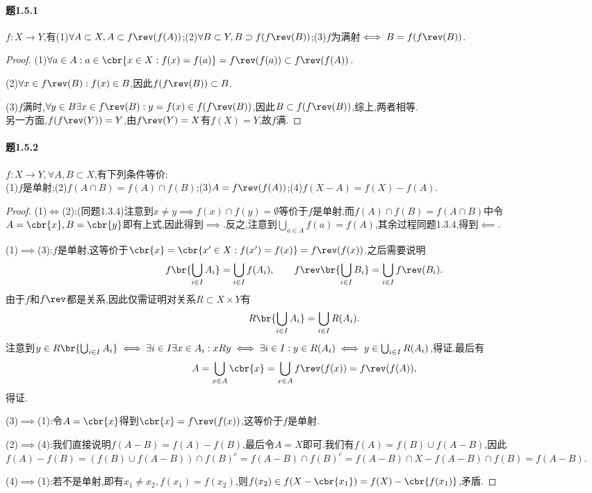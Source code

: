 \documentclass{article}
\begin{document}
\paragraph{题1.5.1}$f:X\to Y$,有(1)$\forall A\subset X, A\subset f\rev(f(A))$;(2)$\forall B\subset Y, B\supset f(f\rev(B))$;(3)$f$为满射$\iff B=f(f\rev(B))$.
\begin{proof}
    (1)$\forall a\in A: a\in \cbr{x\in X:f(x)=f(a)}=f\rev(f(a))\subset f\rev(f(A))$.

    (2)$\forall x\in f\rev(B):f(x)\in B$,因此$f(f\rev(B))\subset B$.

    (3)$f$满时,$\forall y\in B\exists x\in f\rev(B):y=f(x)\in f(f\rev(B))$,因此$B\subset f(f\rev(B))$,综上,两者相等.\\
    另一方面,$f(f\rev(Y))=Y$,由$f\rev(Y)=X$有$f(X)=Y$,故$f$满.
\end{proof}

\paragraph{题1.5.2}$f:X\to Y, \forall A,B\subset X$,有下列条件等价:\\
(1)$f$是单射;(2)$f(A\cap B)=f(A)\cap f(B)$;(3)$A=f\rev(f(A))$;(4)$f(X-A)=f(X)-f(A)$.
\begin{proof}
    (1)$\iff$(2):(同题1.3.4)注意到$x\neq y\implies f(x)\cap f(y)=\emptyset$等价于$f$是单射,而$f(A)\cap f(B)=f(A\cap B)$中令$A=\cbr{x},B=\cbr{y}$即有上式,因此得到$\implies$.反之,注意到$\bigcup_{a\in A}f(a)=f(A)$,其余过程同题1.3.4,得到$\impliedby$.

    (1)$\implies$(3):$f$是单射,这等价于$\cbr{x}=\cbr{x'\in X:f(x')=f(x)}=f\rev(f(x))$.之后需要说明
    $$f\br{\bigcup_{i\in I}A_i}=\bigcup_{i\in I}f(A_i),\qquad f\rev\br{\bigcup_{i\in I}B_i}=\bigcup_{i\in I}f\rev(B_i).$$
    由于$f$和$f\rev$都是关系,因此仅需证明对关系$R\subset X\times Y$有$$R\br{\bigcup_{i\in I}A_i}=\bigcup_{i\in I}R(A_i).$$
    注意到$y\in R\br{\bigcup_{i\in I}A_i}\iff \exists i\in I\exists x\in A_i:xRy\iff \exists i\in I:y\in R(A_i)\iff y\in \bigcup_{i\in I}R(A_i)$,得证.最后有
    $$A=\bigcup_{x\in A}\cbr{x}=\bigcup_{x\in A}f\rev(f(x))=f\rev(f(A)),$$得证.

    (3)$\implies$(1):令$A=\cbr{x}$得到$\cbr{x}=f\rev(f(x))$,这等价于$f$是单射.

    (2)$\implies$(4):我们直接说明$f(A-B)=f(A)-f(B)$,最后令$A=X$即可.我们有$f(A)=f(B)\cup f(A-B)$,因此$f(A)-f(B)=(f(B)\cup f(A-B))\cap f(B)^c=f(A-B)\cap f(B)^c=f(A-B)\cap X-f(A-B)\cap f(B)=f(A-B)$.

    (4)$\implies$(1):若不是单射,即有$x_1\neq x_2, f(x_1)=f(x_2)$,则$f(x_2)\in f(X-\cbr{x_1})=f(X)-\cbr{f(x_1)}$,矛盾.
\end{proof}
\end{document}
